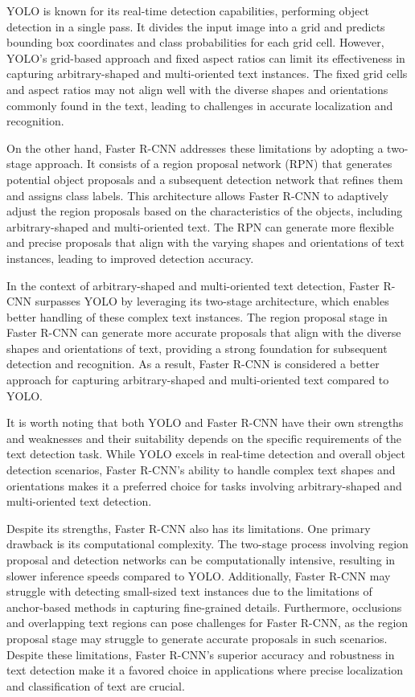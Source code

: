 YOLO is known for its real-time detection capabilities, performing object detection in a single pass. It divides the input image into a grid and predicts bounding box coordinates and class probabilities for each grid cell. However, YOLO's grid-based approach and fixed aspect ratios can limit its effectiveness in capturing arbitrary-shaped and multi-oriented text instances. The fixed grid cells and aspect ratios may not align well with the diverse shapes and orientations commonly found in the text, leading to challenges in accurate localization and recognition.

On the other hand, Faster R-CNN addresses these limitations by adopting a two-stage approach. It consists of a region proposal network (RPN) that generates potential object proposals and a subsequent detection network that refines them and assigns class labels. This architecture allows Faster R-CNN to adaptively adjust the region proposals based on the characteristics of the objects, including arbitrary-shaped and multi-oriented text. The RPN can generate more flexible and precise proposals that align with the varying shapes and orientations of text instances, leading to improved detection accuracy.

In the context of arbitrary-shaped and multi-oriented text detection, Faster R-CNN surpasses YOLO by leveraging its two-stage architecture, which enables better handling of these complex text instances. The region proposal stage in Faster R-CNN can generate more accurate proposals that align with the diverse shapes and orientations of text, providing a strong foundation for subsequent detection and recognition. As a result, Faster R-CNN is considered a better approach for capturing arbitrary-shaped and multi-oriented text compared to YOLO.

It is worth noting that both YOLO and Faster R-CNN have their own strengths and weaknesses and their suitability depends on the specific requirements of the text detection task. While YOLO excels in real-time detection and overall object detection scenarios, Faster R-CNN's ability to handle complex text shapes and orientations makes it a preferred choice for tasks involving arbitrary-shaped and multi-oriented text detection.

Despite its strengths, Faster R-CNN also has its limitations. One primary drawback is its computational complexity. The two-stage process involving region proposal and detection networks can be computationally intensive, resulting in slower inference speeds compared to YOLO. Additionally, Faster R-CNN may struggle with detecting small-sized text instances due to the limitations of anchor-based methods in capturing fine-grained details. Furthermore, occlusions and overlapping text regions can pose challenges for Faster R-CNN, as the region proposal stage may struggle to generate accurate proposals in such scenarios. Despite these limitations, Faster R-CNN's superior accuracy and robustness in text detection make it a favored choice in applications where precise localization and classification of text are crucial.

